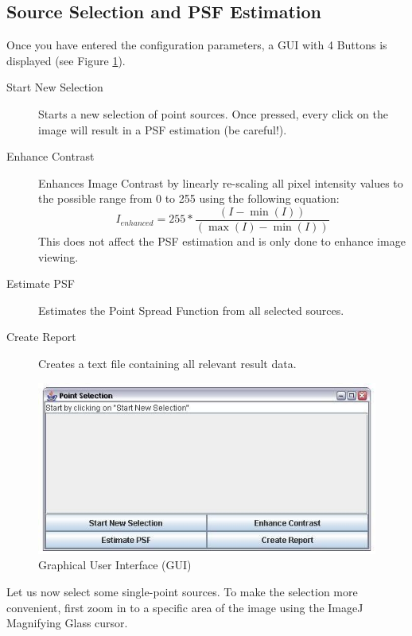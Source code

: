 \subsection{Source Selection and PSF Estimation}
Once you have entered the configuration parameters, a GUI with 4 Buttons is displayed (see Figure \ref{gui}).
\begin{description}
\item[Start New Selection] Starts a new selection of point sources. Once pressed, every click on the image will result in a PSF estimation (be careful!).
\item[Enhance Contrast] Enhances Image Contrast by linearly re-scaling all pixel intensity values to the possible range from 0 to 255 using the following equation:
%
	\[
	I_{enhanced} = 255 * \frac{\left(I - \min\left(I\right)\right)}{\left(\max\left(I\right) - \min\left(I\right)\right)}
\]
%
 This does not affect the PSF estimation and is only done to enhance image viewing.
\item[Estimate PSF] Estimates the Point Spread Function from all selected sources.
\item[Create Report] Creates a text file containing all relevant result data.
\end{description}
\begin{figure}
\centering
\includegraphics[scale=0.6]{gui.jpg}
\caption{Graphical User Interface (GUI)}
\label{gui}
\end{figure}
Let us now select some single-point sources. To make the selection more convenient, first zoom in to a specific area of the image using the ImageJ Magnifying Glass cursor. 

